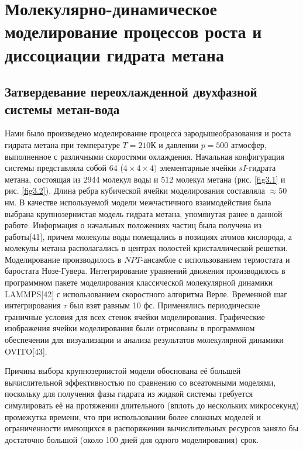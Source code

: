 \chapter{Молекулярно-динамическое моделирование процессов роста и диссоциации гидрата метана}
\section{Затвердевание переохлажденной двухфазной системы метан-вода}
Нами было произведено моделирование процесса зародышеобразования и роста гидрата метана при температуре $T=210$К и давлении $p=500$ атмосфер, выполненное с различными скоростями охлаждения. Начальная конфигурация системы представляла собой 64 ($4\times 4\times 4)$ элементарные ячейки $sI$-гидрата метана, состоящая из 2944 молекул воды и 512 молекул метана (рис. \ref{fig3.1} и рис. \ref{fig3.2}). Длина ребра кубической ячейки моделирования составляла $\approx 50$ нм. В качестве используемой модели межчастичного взаимодействия была выбрана крупнозернистая модель гидрата метана, упомянутая ранее в данной работе. Информация о начальных положениях частиц была получена из работы[41], причем молекулы воды помещались в позициях атомов кислорода, а молекулы метана располагались в центрах полостей кристаллической решетки. Моделирование производилось в $NPT$-ансамбле с использованием термостата и баростата Нозе-Гувера. Интегрирование уравнений движения производилось в программном пакете моделирования классической молекулярной динамики LAMMPS[42] с использованием скоростного алгоритма Верле. Временной шаг интегрирования $\tau$ был взят равным 10 фс. Применялись периодические граничные условия для всех стенок ячейки моделирования. Графические изображения ячейки моделирования были отрисованы в программном обеспечении для визуализации и анализа результатов молекулярной динамики OVITO[43].

Причина выбора крупнозернистой модели обоснована её большей вычислительной эффективностью по сравнению со всеатомными моделями, поскольку для получения фазы гидрата из жидкой системы требуется симулировать её на протяжении длительного (вплоть до нескольких микросекунд) промежутка времени, что при использовании более сложных моделей и ограниченности имеющихся в распоряжении вычислительных ресурсов заняло бы достаточно большой (около 100 дней для одного моделирования) срок.

